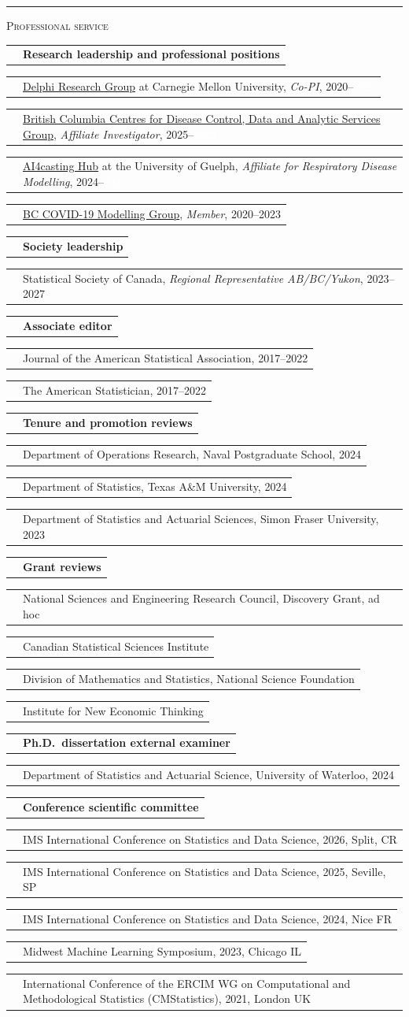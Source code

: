 \documentclass[11pt,letterpaper]{minimal/moderncv}
\makeatletter
\newcommand{\xx}{\textcolor{white}{2022}}
\newcommand{\bolditem}[1]{\cvitem{}{\textbf{#1}}}
\renewcommand{\section}[1]{  \par\addvspace{15pt}%
  \parbox[t]{\hintscolumnwidth}{\strut\raggedleft\raisebox{4pt}%
  {\rule{\hintscolumnwidth}{2pt}}}%
  \hspace{\separatorcolumnwidth}%
  \textsc{\Large #1}\par\nobreak\addvspace{6pt}%
}
\renewcommand*{\cvitem}[2]{%
  \begin{tabular}{@{}p{\hintscolumnwidth}@{\hspace{\separatorcolumnwidth}}%
    p{\maincolumnwidth}@{}}%
    \raggedleft {#1} &  {#2}%
  \end{tabular}%
}
\makeatother
\begin{document}
\section{Professional service}


\bolditem{Research leadership and professional positions}
\cvitem{}{\href{https://delphi.cmu.edu/}{Delphi Research Group} at Carnegie Mellon University, \emph{Co-PI}, 2020--\xx}
\cvitem{}{\href{https://www.bccdc.ca/our-services/service-areas/data-analytic-services}{British Columbia Centres for Disease Control, Data and
Analytic Services Group}, \emph{Affiliate Investigator}, 2025--\xx}
\cvitem{}{\href{https://4castinghub.uoguelph.ca/}{AI4casting Hub} at the University of Guelph, \emph{Affiliate for
Respiratory Disease Modelling}, 2024--\xx}
\cvitem{}{\href{https://bccovid-19group.ca}{BC COVID-19 Modelling Group}, \emph{Member}, 2020--2023}

\vspace{6pt}
\bolditem{Society leadership}
\cvitem{}{Statistical Society of Canada, \emph{Regional Representative AB/BC/Yukon}, 2023--2027}

\vspace{6pt}
\bolditem{Associate editor}
\cvitem{}{Journal of the American Statistical Association, 2017--2022}
\cvitem{}{The American Statistician, 2017--2022}

\vspace{6pt}
\bolditem{Tenure and promotion reviews}
\cvitem{}{Department of Operations Research, Naval Postgraduate School, 2024}
\cvitem{}{Department of Statistics, Texas A\&M University, 2024}
\cvitem{}{Department of Statistics and Actuarial Sciences, Simon Fraser University, 2023}

\vspace{6pt}
\bolditem{Grant reviews}
\cvitem{}{National Sciences and Engineering Research Council, Discovery Grant, ad hoc}
\cvitem{}{Canadian Statistical Sciences Institute}
\cvitem{}{Division of Mathematics and Statistics, National Science Foundation}
\cvitem{}{Institute for New Economic Thinking}

\vspace{6pt}
\bolditem{Ph.D.\ dissertation external examiner}
\cvitem{}{Department of Statistics and Actuarial Science, University of Waterloo, 2024}


\vspace{6pt}
\bolditem{Conference scientific committee}
\cvitem{}{IMS International Conference on Statistics and Data Science, 2026, Split, CR}
\cvitem{}{IMS International Conference on Statistics and Data Science, 2025, Seville, SP}
\cvitem{}{IMS International Conference on Statistics and Data Science, 2024, Nice FR}
\cvitem{}{Midwest Machine Learning Symposium, 2023, Chicago IL}
\cvitem{}{International Conference of the ERCIM WG on Computational and 
Methodological Statistics (CMStatistics), 2021, London UK}
\end{document}
